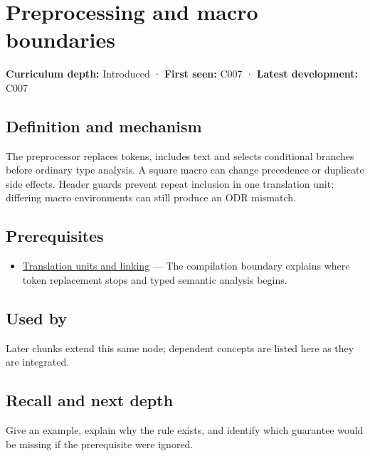 \hypertarget{appendix-33c0a92ce855}{}
\section{Preprocessing and macro boundaries}\label{appendix-33c0a92ce855-preprocessing-and-macro-boundaries}

\textbf{Curriculum depth:} Introduced · \textbf{First seen:} C007 · \textbf{Latest development:} C007

\subsection{Definition and mechanism}\label{appendix-33c0a92ce855-definition-and-mechanism}

The preprocessor replaces tokens, includes text and selects conditional branches before ordinary type analysis. A square macro can change precedence or duplicate side effects. Header guards prevent repeat inclusion in one translation unit; differing macro environments can still produce an ODR mismatch.

\subsection{Prerequisites}\label{appendix-33c0a92ce855-prerequisites}

\begin{itemize}
\tightlist
\item
  \hyperref[appendix-806686359e1b]{Translation units and linking} --- The compilation boundary explains where token replacement stops and typed semantic analysis begins.
\end{itemize}

\subsection{Used by}\label{appendix-33c0a92ce855-used-by}

Later chunks extend this same node; dependent concepts are listed here as they are integrated.

\subsection{Recall and next depth}\label{appendix-33c0a92ce855-recall-and-next-depth}

Give an example, explain why the rule exists, and identify which guarantee would be missing if the prerequisite were ignored.

